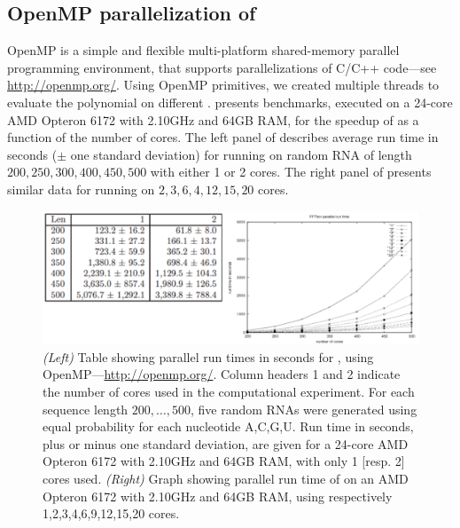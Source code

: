 \subsection{OpenMP parallelization of \fftbor}
\label{subsec:fftbor:openmp}

OpenMP is a simple and flexible
multi-platform shared-memory parallel programming environment, that supports
parallelizations of C/C++ code---see \url{http://openmp.org/}.
Using OpenMP primitives, we created multiple threads to evaluate the polynomial
\fullZx on different \nRoUs. 
presents benchmarks, executed on
a 24-core AMD Opteron 6172 with 2.10GHz and 64GB RAM, for the speedup
of \fftbor as a function of the number of cores.
The left panel of  describes average
run time in seconds ($\pm$ one standard deviation) for running \fftbor
on random RNA of length $200,250,300,400,450,500$ with either 1 or 2 cores.
The right panel of 
presents similar data for running
\fftbor on $2,3,6,4,12,15,20$ cores.

\begin{figure}[!ht]
\centering
\includegraphics[width=.9\textwidth]{Figures/FFTbor/benchmarkingOpenMP.pdf}
\caption{{\em (Left)} Table showing parallel run times in seconds
for \fftbor, using
OpenMP---\url{http://openmp.org/}. Column headers 1 and 2 indicate
the number of cores used in the computational experiment.
For each sequence length $200,\dots,500$,
five random RNAs were generated using equal probability for each nucleotide
A,C,G,U. Run time in seconds, plus or minus one standard deviation, are
given for a 24-core
AMD Opteron 6172 with 2.10GHz and 64GB RAM, with only 1 [resp. 2] cores
used.
{\em (Right)} Graph showing parallel run time of \fftbor on
an AMD Opteron 6172 with 2.10GHz and 64GB RAM, using respectively
1,2,3,4,6,9,12,15,20 cores.
}
\label{fig:fftbor:benchmarkingParallel}
\end{figure}

